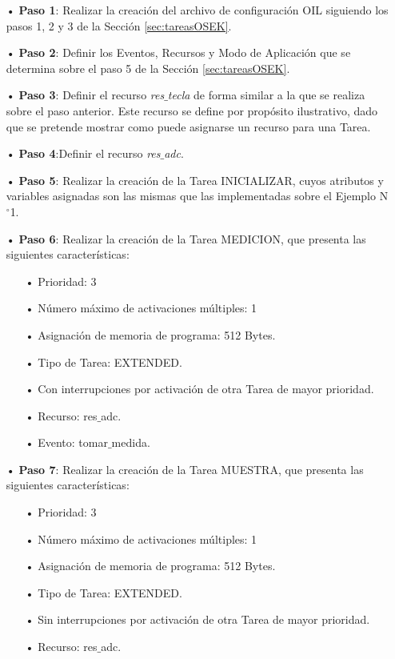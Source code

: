 \documentclass[12pt,letterpaper]{article}
\begin{document}
\begin{enumerate}
\item[•]\textbf{Paso 1}: Realizar la creación del archivo de configuración OIL siguiendo los pasos 1, 2 y 3 de la Sección \ref{sec:tareasOSEK}.
\item[•]\textbf{Paso 2}: Definir los Eventos, Recursos y Modo de Aplicación que se determina sobre el paso 5 de la Sección \ref{sec:tareasOSEK}.
\item[•]\textbf{Paso 3}: Definir el recurso \textit{res$\_$tecla} de forma similar a la que se realiza sobre el paso anterior. Este recurso se define por propósito ilustrativo, dado que se pretende mostrar como puede asignarse un recurso para una Tarea.
\item[•]\textbf{Paso 4}:Definir el recurso \textit{res$\_$adc}.

\item[•]\textbf{Paso 5}: Realizar la creación de la Tarea INICIALIZAR, cuyos atributos y variables asignadas son las mismas que las implementadas sobre el Ejemplo N$^{\circ}$1.

\item[•]\textbf{Paso 6}: Realizar la creación de la Tarea MEDICION, que presenta las siguientes características:
\begin{enumerate}
\item[•]Prioridad: 3
\item[•]Número máximo de activaciones múltiples: 1
\item[•]Asignación de memoria de programa: 512 Bytes.
\item[•]Tipo de Tarea: EXTENDED.
\item[•]Con interrupciones por activación de otra Tarea de mayor prioridad.
\item[•]Recurso: res$\_$adc.
\item[•]Evento: tomar$\_$medida.
\end{enumerate}

\item[•]\textbf{Paso 7}: Realizar la creación de la Tarea MUESTRA, que presenta las siguientes características:
\begin{enumerate}
\item[•]Prioridad: 3
\item[•]Número máximo de activaciones múltiples: 1
\item[•]Asignación de memoria de programa: 512 Bytes.
\item[•]Tipo de Tarea: EXTENDED.
\item[•]Sin interrupciones por activación de otra Tarea de mayor prioridad.
\item[•]Recurso: res$\_$adc.
\end{enumerate}


\end{enumerate}
\end{document}
